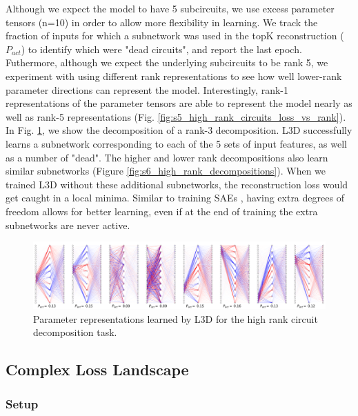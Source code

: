 \documentclass{article}
\theoremstyle{plain}
\theoremstyle{definition}
\theoremstyle{remark}
\begin{document}
Although we expect the model to have 5 subcircuits, we use excess parameter tensors (n=10) in order to allow more flexibility in learning. We track the fraction of inputs for which a subnetwork was used in the topK reconstruction ($P_{act}$) to identify which were "dead circuits", and report the last epoch. Futhermore, although we expect the underlying subcircuits to be rank 5, we experiment with using different rank representations to see how well lower-rank parameter directions can represent the model. Interestingly, rank-1 representations of the parameter tensors are able to represent the model nearly as well as rank-5 representations (Fig. \ref{fig:s5_high_rank_circuits_loss_vs_rank}). In Fig. \ref{fig:7_high_rank_decomposition}, we show the decomposition of a rank-3 decomposition. L3D successfully learns a subnetwork corresponding to each of the 5 sets of input features, as well as a number of "dead". The higher and lower rank decompositions also learn similar subnetworks (Figure \ref{fig:s6_high_rank_decompositions}). When we trained L3D without these additional subnetworks, the reconstruction loss would get caught in a local minima. Similar to training SAEs \cite{cunningham2023sparse}, having extra degrees of freedom allows for better learning, even if at the end of training the extra subnetworks are never active.


\begin{figure}[htbp]
    \centerline{\includegraphics[width=\textwidth]{../figures/7_high_rank_decomposition.pdf}}
    \centering
    \caption{Parameter representations learned by L3D for the high rank circuit decomposition task.}\label{fig:7_high_rank_decomposition}
\end{figure}


\subsection{Complex Loss Landscape}


\subsubsection{Setup}
\end{document}
